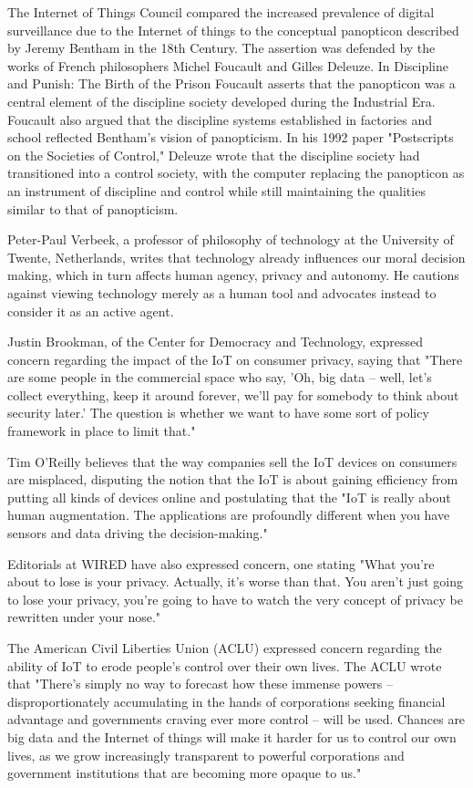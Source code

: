 \documentclass[12pt, a4paper, twoside]{article}
\begin{document}
The Internet of Things Council compared the increased prevalence of digital surveillance due to the Internet of things to the conceptual panopticon described by Jeremy Bentham in the 18th Century. The assertion was defended by the works of French philosophers Michel Foucault and Gilles Deleuze. In Discipline and Punish: The Birth of the Prison Foucault asserts that the panopticon was a central element of the discipline society developed during the Industrial Era. Foucault also argued that the discipline systems established in factories and school reflected Bentham's vision of panopticism. In his 1992 paper "Postscripts on the Societies of Control," Deleuze wrote that the discipline society had transitioned into a control society, with the computer replacing the panopticon as an instrument of discipline and control while still maintaining the qualities similar to that of panopticism.

Peter-Paul Verbeek, a professor of philosophy of technology at the University of Twente, Netherlands, writes that technology already influences our moral decision making, which in turn affects human agency, privacy and autonomy. He cautions against viewing technology merely as a human tool and advocates instead to consider it as an active agent.

Justin Brookman, of the Center for Democracy and Technology, expressed concern regarding the impact of the IoT on consumer privacy, saying that "There are some people in the commercial space who say, 'Oh, big data – well, let's collect everything, keep it around forever, we'll pay for somebody to think about security later.' The question is whether we want to have some sort of policy framework in place to limit that."

Tim O'Reilly believes that the way companies sell the IoT devices on consumers are misplaced, disputing the notion that the IoT is about gaining efficiency from putting all kinds of devices online and postulating that the "IoT is really about human augmentation. The applications are profoundly different when you have sensors and data driving the decision-making."

Editorials at WIRED have also expressed concern, one stating "What you're about to lose is your privacy. Actually, it's worse than that. You aren't just going to lose your privacy, you're going to have to watch the very concept of privacy be rewritten under your nose."

The American Civil Liberties Union (ACLU) expressed concern regarding the ability of IoT to erode people's control over their own lives. The ACLU wrote that "There's simply no way to forecast how these immense powers – disproportionately accumulating in the hands of corporations seeking financial advantage and governments craving ever more control – will be used. Chances are big data and the Internet of things will make it harder for us to control our own lives, as we grow increasingly transparent to powerful corporations and government institutions that are becoming more opaque to us."
\end{document}
